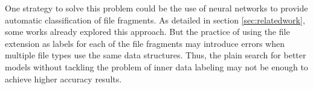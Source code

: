 One strategy to solve this problem could be the use of neural networks to provide automatic classification of file fragments. As detailed in section \ref{sec:relatedwork}, some works already explored this approach. But the practice of using the file extension as labels for each of the file fragments may introduce errors when multiple file types use the same data structures. Thus, the plain search for better models without tackling the problem of inner data labeling may not be enough to achieve higher accuracy results.